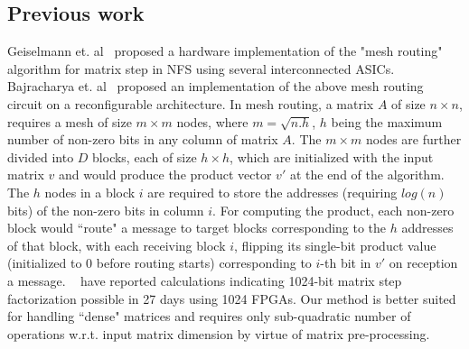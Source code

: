 \documentclass[conference, 9pt]{IEEEtran}
\newcommand{\red}[1]{\textcolor{red}{#1}}
\begin{document}
\subsection{Previous work}
Geiselmann et. al~\cite{geiselmann2003hardware} proposed a hardware
implementation of the "mesh routing" algorithm for matrix step in NFS using several interconnected 
ASICs. Bajracharya et. al~\cite{bajracharya2004reconfigurable} proposed an 
implementation of the above mesh routing circuit on a reconfigurable 
architecture. In mesh routing, a matrix $A$ of size $n\times n$, requires a mesh of 
size $m\times m$ nodes, where $m = \sqrt{n.h}$, $h$ being the maximum number of 
non-zero bits in any column of matrix $A$.  The $m\times m$ nodes are further divided 
into $D$ blocks, each of size $h\times h$, which are initialized with the input matrix 
$v$ and would produce the product vector $v'$ at the end of the algorithm. The 
$h$ nodes in a block $i$ are 
required to store the addresses (requiring $log(n)$ bits) of the non-zero bits 
in column $i$. For computing the product, each non-zero block would ``route" a 
message to target blocks corresponding to the $h$ addresses of that block, with 
each receiving block $i$, flipping its single-bit product value (initialized to 
0 before routing starts) corresponding to $i$-th bit in $v'$ on reception a 
message. ~\cite{bajracharya2004reconfigurable} have reported calculations indicating 1024-bit matrix step factorization possible in 27 days using 1024 FPGAs. Our method is better suited for handling ``dense" matrices and requires only sub-quadratic number of operations w.r.t. input matrix dimension by virtue of matrix pre-processing.
\end{document}
